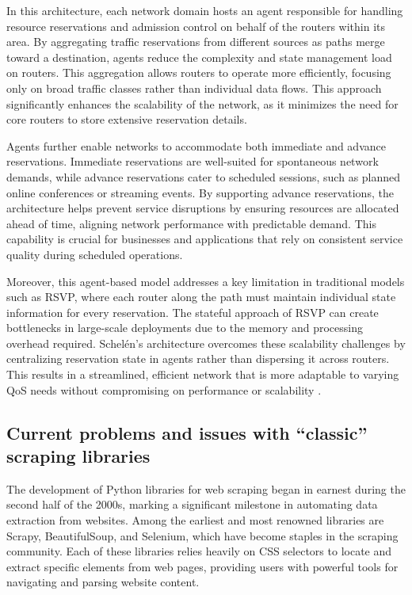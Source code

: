 In this architecture, each network domain hosts an agent responsible for handling resource reservations and admission control on behalf of the routers within its area. By aggregating traffic reservations from different sources as paths merge toward a destination, agents reduce the complexity and state management load on routers. This aggregation allows routers to operate more efficiently, focusing only on broad traffic classes rather than individual data flows. This approach significantly enhances the scalability of the network, as it minimizes the need for core routers to store extensive reservation details.

Agents further enable networks to accommodate both immediate and advance reservations. Immediate reservations are well-suited for spontaneous network demands, while advance reservations cater to scheduled sessions, such as planned online conferences or streaming events. By supporting advance reservations, the architecture helps prevent service disruptions by ensuring resources are allocated ahead of time, aligning network performance with predictable demand. This capability is crucial for businesses and applications that rely on consistent service quality during scheduled operations.

Moreover, this agent-based model addresses a key limitation in traditional models such as RSVP, where each router along the path must maintain individual state information for every reservation. The stateful approach of RSVP can create bottlenecks in large-scale deployments due to the memory and processing overhead required. Schelén’s architecture overcomes these scalability challenges by centralizing reservation state in agents rather than dispersing it across routers. This results in a streamlined, efficient network that is more adaptable to varying QoS needs without compromising on performance or scalability \cite{schelen1998qosagents}.


\subsection{Current problems and issues with “classic” scraping libraries}

The development of Python libraries for web scraping began in earnest during the second half of the 2000s, marking a significant milestone in automating data extraction from websites. Among the earliest and most renowned libraries are Scrapy, BeautifulSoup, and Selenium, which have become staples in the scraping community. Each of these libraries relies heavily on CSS selectors to locate and extract specific elements from web pages, providing users with powerful tools for navigating and parsing website content.

